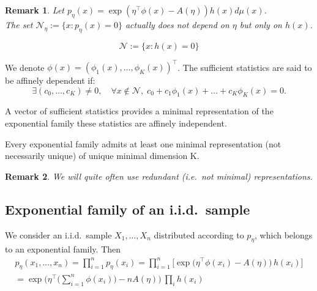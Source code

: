 \documentclass[12pt]{report}
\newtheorem{remark}{Remark}[section]
\begin{document}
\begin{remark}
Let $p_\eta(x) = \exp \left(\eta^\top \phi(x) - A(\eta)\right) h(x) d\mu(x)$.\\
The set $\mathcal{N}_\eta:= \{x: p_\eta(x) = 0\} $ actually does not
depend on $\eta$ but only on $h(x)$.
\end{remark}

\begin{definition}
$$ \mathcal{N} := \lbrace x : h(x)=0 \rbrace $$
\end{definition}

\begin{definition}
We denote $\phi(x) = (\phi_1(x), \ldots, \phi_K(x))^\top$. The sufficient statistics are said to be affinely dependent if:
\[ \exists( c_0, \ldots, c_K ) \neq 0 , \quad \forall x \not\in \mathcal{N}, \; c_0 + c_1 \phi_1(x) + \ldots + c_K \phi_K(x) = 0. \]
\end{definition}

\begin{definition}
A vector of sufficient statistics provides a minimal representation of the exponential family these statistics are affinely independent.
\end{definition}

\begin{theorem}
Every exponential family admits at least one minimal representation (not necessarily unique) of unique minimal dimension K.
\end{theorem}

\begin{remark}
We will quite often use redundant (i.e.\ not minimal) representations.
\end{remark}

\subsection{Exponential family of an i.i.d.\ sample}
We consider an i.i.d.\ sample $X_1, \ldots, X_n$ distributed according to $p_\eta$, which belongs to an exponential family. Then
\[ \begin{aligned}
p_\eta(x_1, \ldots, x_n) = \prod_{i=1}^n p_\eta(x_i) = \prod_{i=1}^n  \big [\exp\big (\eta^\top \phi(x_i) - A(\eta)\big ) \, h(x_i)\big ]\\
= \exp \bigg (\eta^\top \Big (\sum_{i = 1}^n \phi(x_i) \Big) - n A(\eta) \bigg ) \: \prod_i h(x_i)
\end{aligned} \]
\end{document}
